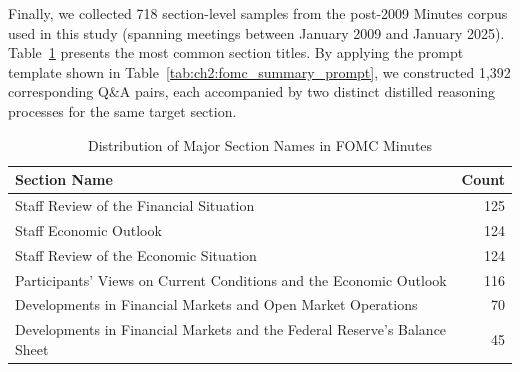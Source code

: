 %
Finally, we collected 718 section-level samples from the post-2009 Minutes corpus used in this study (spanning meetings between January 2009 and January 2025). Table~\ref{tab:ch2:section_name_distribution} presents the most common section titles. By applying the prompt template shown in Table~\ref{tab:ch2:fomc_summary_prompt}, we constructed 1,392 corresponding Q\&A pairs, each accompanied by two distinct distilled reasoning processes for the same target section.



\begin{table}[ht]
    \centering
    \footnotesize
    \begin{tabular}{p{} r}
        \toprule
        \textbf{Section Name} & \textbf{Count} \\
        \midrule
        Staff Review of the Financial Situation & 125 \\
        Staff Economic Outlook & 124 \\
        Staff Review of the Economic Situation & 124 \\
        Participants' Views on Current Conditions and the Economic Outlook & 116 \\
        Developments in Financial Markets and Open Market Operations & 70 \\
        Developments in Financial Markets and the Federal Reserve's Balance Sheet & 45 \\
        \bottomrule
    \end{tabular}
    \caption{Distribution of Major Section Names in FOMC Minutes}
    \label{tab:ch2:section_name_distribution}
\end{table}

